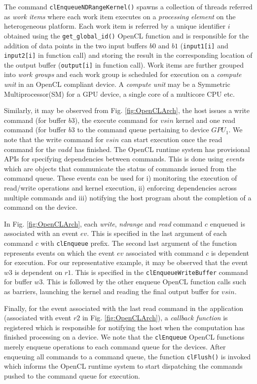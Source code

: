 	\par The command {\tt clEnqueueNDRangeKernel()} spawns a collection of threads referred as \textit{work items} where each work item executes on a \textit{processing element} on the heterogeneous platform. Each work item is referred by a unique identifier $i$ obtained using the {\tt get\_global\_id()} OpenCL function and is responsible for the addition of  data points in the two input buffers $b0$ and $b1$ ({\tt input1[i]} and {\tt input2[i]} in function call) and storing the result in the corresponding location of the output buffer ({\tt output[i]} in function call). Work items are further grouped into \textit{work groups} and each work group is scheduled for execution on a \textit{compute unit} in an OpenCL compliant device. A \textit{compute unit} may be a Symmetric Multiprocessor(SM) for a GPU device, a single core of a multicore CPU etc. 
	\par Similarly, it may be observed from Fig. \ref{fig:OpenCLArch}, the host issues a write command (for buffer $b3$), the execute command for $vsin$ kernel and one read command (for buffer $b3$ to the command queue pertaining to device $GPU_1$. We note that the write command for $vsin$ can start execution once the read command for the $vadd$ has finished. The OpenCL runtime system  has provisional APIs for specifying dependencies between commands. This is done using {\em events} which are objects that communicate the status of commands issued from the command queue. These events can be used for i) monitoring the execution of read/write operations and kernel execution, ii) enforcing dependencies across multiple commands and iii) notifying the host program about the completion of a command on the device. 
	\par In Fig. \ref{fig:OpenCLArch}, each \textit{write}, \textit{ndrange} and \textit{read} command $c$ enqueued is associated with an event $ev$. This is specified in the last argument of each command $c$ with {\tt clEnqueue} prefix. The second last argument of the function represents events on which the event $ev$ associated with command $c$ is dependent for execution. For our representative example, it may be observed that the event $w3$ is dependent on $r1$. This is specified in the {\tt clEnqueueWriteBuffer} command for buffer $w3$. This is followed by the other enqueue OpenCL function calls such as barriers,   launching the kernel and reading the final output buffer for $vsin$.   
	\par Finally, for the event associated with the last read command in the application (associated with event $r2$ in Fig. \ref{fig:OpenCLArch}), a \textit{callback function} is registered which is responsible for notifying the host when the computation has finished processing on a device. We note that the {\tt clEnqueue} OpenCL functions merely enqueue operations to each command queue for the devices. After enqueuing all commands to a command queue, the function {\tt clFlush()} is invoked which informs the OpenCL runtime system to start dispatching the commands pushed to the command queue for execution.  
